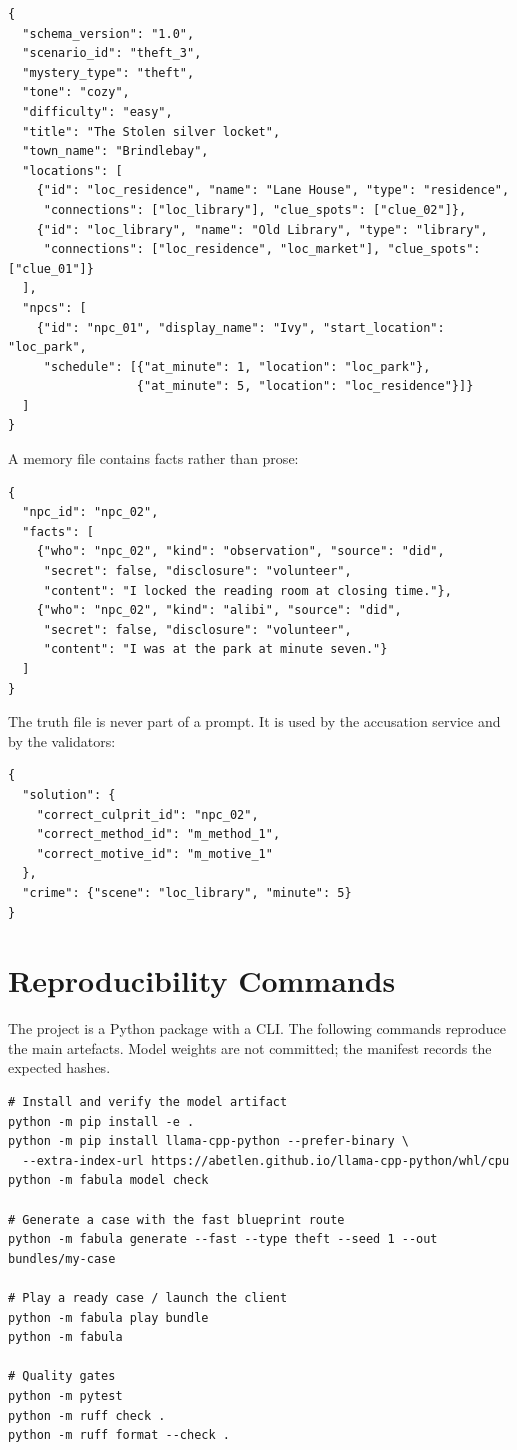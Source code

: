 ﻿\documentclass[11pt,a4paper]{report}
\begin{document}
\begin{lstlisting}[style=bundle]
{
  "schema_version": "1.0",
  "scenario_id": "theft_3",
  "mystery_type": "theft",
  "tone": "cozy",
  "difficulty": "easy",
  "title": "The Stolen silver locket",
  "town_name": "Brindlebay",
  "locations": [
    {"id": "loc_residence", "name": "Lane House", "type": "residence",
     "connections": ["loc_library"], "clue_spots": ["clue_02"]},
    {"id": "loc_library", "name": "Old Library", "type": "library",
     "connections": ["loc_residence", "loc_market"], "clue_spots": ["clue_01"]}
  ],
  "npcs": [
    {"id": "npc_01", "display_name": "Ivy", "start_location": "loc_park",
     "schedule": [{"at_minute": 1, "location": "loc_park"},
                  {"at_minute": 5, "location": "loc_residence"}]}
  ]
}
\end{lstlisting}

A memory file contains facts rather than prose:

\begin{lstlisting}[style=bundle]
{
  "npc_id": "npc_02",
  "facts": [
    {"who": "npc_02", "kind": "observation", "source": "did",
     "secret": false, "disclosure": "volunteer",
     "content": "I locked the reading room at closing time."},
    {"who": "npc_02", "kind": "alibi", "source": "did",
     "secret": false, "disclosure": "volunteer",
     "content": "I was at the park at minute seven."}
  ]
}
\end{lstlisting}

The truth file is never part of a prompt. It is used by the accusation service and by the validators:

\begin{lstlisting}[style=bundle]
{
  "solution": {
    "correct_culprit_id": "npc_02",
    "correct_method_id": "m_method_1",
    "correct_motive_id": "m_motive_1"
  },
  "crime": {"scene": "loc_library", "minute": 5}
}
\end{lstlisting}

\chapter{Reproducibility Commands}
\label{app:repro}

The project is a Python package with a CLI. The following commands reproduce the main artefacts. Model weights are not committed; the manifest records the expected hashes.

\begin{lstlisting}[style=bundle]
# Install and verify the model artifact
python -m pip install -e .
python -m pip install llama-cpp-python --prefer-binary \
  --extra-index-url https://abetlen.github.io/llama-cpp-python/whl/cpu
python -m fabula model check

# Generate a case with the fast blueprint route
python -m fabula generate --fast --type theft --seed 1 --out bundles/my-case

# Play a ready case / launch the client
python -m fabula play bundle
python -m fabula

# Quality gates
python -m pytest
python -m ruff check .
python -m ruff format --check .
\end{lstlisting}
\end{document}
